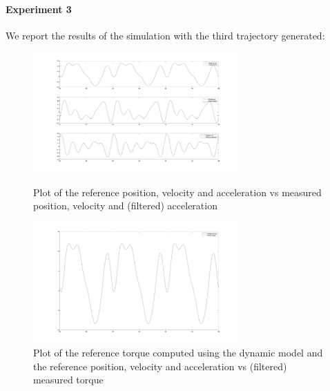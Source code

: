 \documentclass{article}
\begin{document}
\paragraph{Experiment 3}
We report the results of the simulation with the third trajectory generated:
\begin{figure}[!htbp]
\centering
\includegraphics[width=0.7\textwidth]{images/1-dof/new_experiment5_traj.png}
\caption{Plot of the reference position, velocity and acceleration vs measured position, velocity and (filtered) acceleration}
\includegraphics[width=0.7\textwidth]{images/1-dof/new_experiment5.png}
\caption{Plot of the reference torque computed using the dynamic model and the reference position, velocity and acceleration vs (filtered) measured torque}
\end{figure}
\pagebreak
\end{document}
